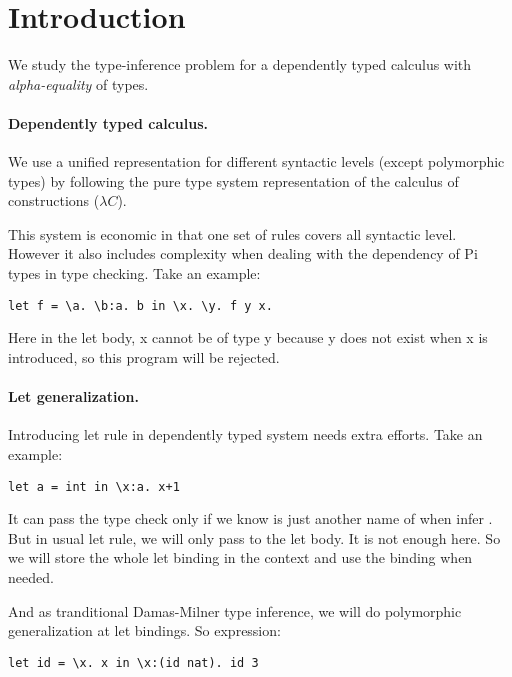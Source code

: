 \section{Introduction}

We study the type-inference problem for a dependently 
typed calculus with \emph{alpha-equality} of types.

\paragraph{Dependently typed calculus.} We use a unified
representation for different syntactic levels (except polymorphic
types) by following the pure type system representation of the
calculus of constructions ($\lambda C$).

This system is economic in that one set of rules covers all syntactic
level. However it also includes complexity when dealing with the
dependency of Pi types in type checking. Take an example:

\begin{lstlisting}
let f = \a. \b:a. b in \x. \y. f y x.
\end{lstlisting}

Here in the let body, \lst x cannot be of type \lst y because \lst y
does not exist when \lst x is introduced, so this program will be
rejected.

\paragraph{Let generalization.} Introducing let rule in dependently
typed system needs extra efforts. Take an example:

\begin{lstlisting}
let a = int in \x:a. x+1
\end{lstlisting}

It can pass the type check only if we know  is just another
name of  when infer . But in usual let rule, we will
only pass  to the let body. It is not enough here. So we will
store the whole let binding  in the context and use the
binding when needed.

And as tranditional Damas-Milner type inference, we will do
polymorphic generalization at let bindings. So expression:

\begin{lstlisting}
let id = \x. x in \x:(id nat). id 3
\end{lstlisting}

